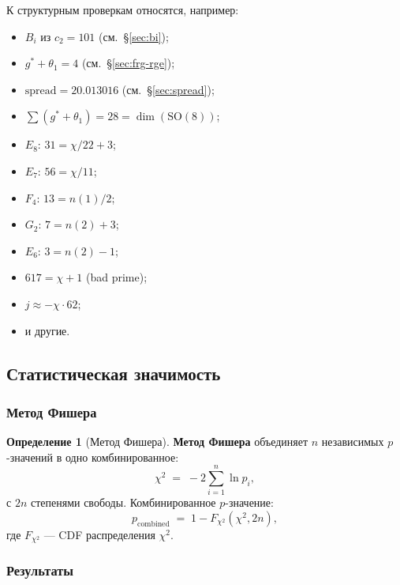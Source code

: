 \documentclass[11pt,a4paper]{article}
\newcommand{\SO}{\ensuremath{\mathrm{SO}}}
\theoremstyle{definition}
\newtheorem{definition}[theorem]{Определение}
\begin{document}
К структурным проверкам относятся, например:
\begin{itemize}
    \item $B_i$ из $c_2 = 101$ (см.~\S\ref{sec:bi});
    \item $g^* + \theta_1 = 4$ (см.~\S\ref{sec:frg-rge});
    \item $\text{spread} = 20.013016$ (см.~\S\ref{sec:spread});
    \item $\sum(g^* + \theta_1) = 28 = \dim(\SO(8))$;
    \item $E_8$: $31 = \chi/22 + 3$;
    \item $E_7$: $56 = \chi/11$;
    \item $F_4$: $13 = n(1)/2$;
    \item $G_2$: $7 = n(2) + 3$;
    \item $E_6$: $3 = n(2) - 1$;
    \item $617 = \chi + 1$ (bad prime);
    \item $j \approx -\chi \cdot 62$;
    \item и другие.
\end{itemize}

\subsection{Статистическая значимость}
\label{subsec:cv-statistical}

\subsubsection{Метод Фишера}

\begin{definition}[Метод Фишера]
\label{def:fisher}
\textbf{Метод Фишера} объединяет $n$ независимых $p$-значений
в одно комбинированное:
\begin{equation}
    \chi^2 \;=\; -2 \sum_{i=1}^{n} \ln p_i,
    \label{eq:fisher-chi2}
\end{equation}
с $2n$ степенями свободы. Комбинированное $p$-значение:
\begin{equation}
    p_{\text{combined}} \;=\; 1 - F_{\chi^2}(\chi^2, 2n),
\end{equation}
где $F_{\chi^2}$ --- CDF распределения $\chi^2$.
\end{definition}

\subsubsection{Результаты}
\end{document}
